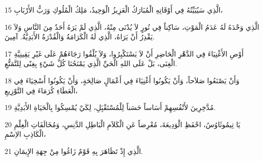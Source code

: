 \par 15 الَّذِي سَيُبَيِّنُهُ فِي أَوْقَاتِهِ الْمُبَارَكُ الْعَزِيزُ الْوَحِيدُ، مَلِكُ الْمُلُوكِ وَرَبُّ الأَرْبَابِ،
\par 16 الَّذِي وَحْدَهُ لَهُ عَدَمُ الْمَوْتِ، سَاكِناً فِي نُورٍ لاَ يُدْنَى مِنْهُ، الَّذِي لَمْ يَرَهُ أَحَدٌ مِنَ النَّاسِ وَلاَ يَقْدِرُ أَنْ يَرَاهُ، الَّذِي لَهُ الْكَرَامَةُ وَالْقُدْرَةُ الأَبَدِيَّةُ. آمِينَ.
\par 17 أَوْصِ الأَغْنِيَاءَ فِي الدَّهْرِ الْحَاضِرِ أَنْ لاَ يَسْتَكْبِرُوا، وَلاَ يُلْقُوا رَجَاءَهُمْ عَلَى غَيْرِ يَقِينِيَّةِ الْغِنَى، بَلْ عَلَى اللهِ الْحَيِّ الَّذِي يَمْنَحُنَا كُلَّ شَيْءٍ بِغِنًى لِلتَّمَتُّعِ.
\par 18 وَأَنْ يَصْنَعُوا صَلاَحاً، وَأَنْ يَكُونُوا أَغْنِيَاءَ فِي أَعْمَالٍ صَالِحَةٍ، وَأَنْ يَكُونُوا أَسْخِيَاءَ فِي الْعَطَاءِ كُرَمَاءَ فِي التَّوْزِيعِ،
\par 19 مُدَّخِرِينَ لأَنْفُسِهِمْ أَسَاساً حَسَناً لِلْمُسْتَقْبَِلِ، لِكَيْ يُمْسِكُوا بِالْحَيَاةِ الأَبَدِيَّةِ.
\par 20 يَا تِيمُوثَاوُسُ، احْفَظِ الْوَدِيعَةَ، مُعْرِضاً عَنِ الْكَلاَمِ الْبَاطِلِ الدَّنِسِ، وَمُخَالَفَاتِ الْعِلْمِ الْكَاذِبِ الاِسْمِ،
\par 21 الَّذِي إِذْ تَظَاهَرَ بِهِ قَوْمٌ زَاغُوا مِنْ جِهَةِ الإِيمَانِ.

